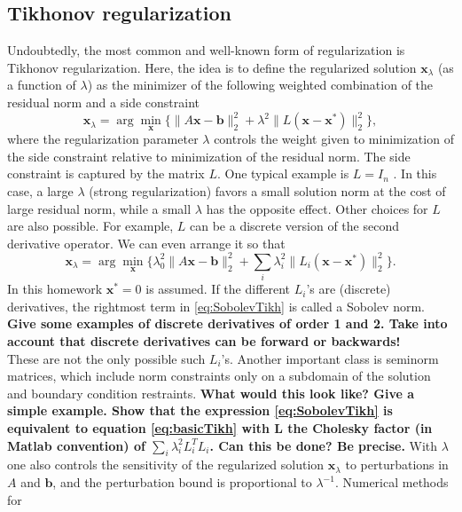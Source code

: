 \documentclass[12pt]{article}
\newcommand{\mbf}[1]{\mathbf{#1}}
\begin{document}
\subsection{Tikhonov regularization}
Undoubtedly, the most common and well-known form of regularization is Tikhonov regularization.
Here, the idea is to define the regularized solution $\mbf{x}_{\lambda}$ (as a function of $\lambda$) as the minimizer of the following weighted
combination of the residual norm and a side constraint
\begin{equation}\label{eq:basicTikh}
\mbf{x}_{\lambda} = \arg\min_{\mbf{x}} \{\|A\mbf{x} - \mbf{b}\|_2^2 + \lambda^2 \|L(\mbf{x} - \mbf{x}^{\ast} )\|_2^2\},
\end{equation}
where the regularization parameter $\lambda$ controls the weight given to minimization of the side constraint
relative to minimization of the residual norm. The side constraint is captured by the matrix $L$. One
typical example is $L = I_n$ . In this case, a large $\lambda$ (strong regularization) favors a small solution norm at the cost of large residual norm, while a small $\lambda$ has the opposite effect. Other choices for $L$ are also
possible. For example, $L$ can be a discrete version of the second derivative operator. We can even
arrange it so that
\begin{equation}\label{eq:SobolevTikh}
\mbf{x}_{\lambda} = \arg\min_{\mbf{x}} \{\lambda_0^2\|A\mbf{x} - \mbf{b}\|_2^2 + \sum_i\lambda^2_i \|L_i(\mbf{x} - \mbf{x}^{\ast} )\|_2^2\}.
\end{equation}
In this homework $\mbf{x}^{\ast}=0$ is assumed. If the different $L_i$'s are (discrete) derivatives, the rightmost
term in \ref{eq:SobolevTikh} is called a Sobolev norm. \textbf{Give some examples of discrete derivatives of order 1 and 2. Take into account that discrete derivatives can be forward or backwards!}\\
These are not the only possible such $L_i$'s. Another important class is seminorm matrices, which include norm constraints only on a subdomain of the solution and boundary condition restraints. \textbf{What would this look like? Give a simple example. Show that the expression \ref{eq:SobolevTikh} is equivalent to equation \ref{eq:basicTikh} with L the Cholesky factor (in Matlab
convention) of $\sum_i\lambda_i^2L_i^TL_i$. Can this be done? Be precise.} With $\lambda$ one also controls the sensitivity of the regularized solution $\mbf{x}_{\lambda}$ to
perturbations in $A$ and $\mbf{b}$, and the perturbation bound is proportional to $\lambda^{-1}$. Numerical methods for
\end{document}
